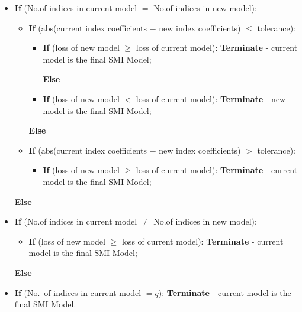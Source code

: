 \documentclass[11pt,a4paper,]{article}
\providecommand{\tightlist}{%
  \setlength{\itemsep}{0pt}\setlength{\parskip}{0pt}}
\begin{document}
\begin{enumerate}
\begin{enumerate}
    \begin{itemize}
    \item
      \textbf{If} (No.of indices in current model \(=\) No.of indices in
      new model):

      \begin{itemize}
      \item
        \textbf{If} (abs(current index coefficients \(-\) new index
        coefficients) \(\le\) tolerance):

        \begin{itemize}
        \item
          \textbf{If} (loss of new model \(\ge\) loss of current model):
          \textbf{Terminate} - current model is the final SMI Model;

          \textbf{Else}
        \item
          \textbf{If} (loss of new model \(<\) loss of current model):
          \textbf{Terminate} - new model is the final SMI Model;
        \end{itemize}

        \textbf{Else}
      \item
        \textbf{If} (abs(current index coefficients \(-\) new index
        coefficients) \(>\) tolerance):

        \begin{itemize}
        \tightlist
        \item
          \textbf{If} (loss of new model \(\ge\) loss of current model):
          \textbf{Terminate} - current model is the final SMI Model;
        \end{itemize}
      \end{itemize}

      \textbf{Else}
    \item
      \textbf{If} (No.of indices in current model \(\neq\) No.of indices
      in new model):

      \begin{itemize}
      \tightlist
      \item
        \textbf{If} (loss of new model \(\ge\) loss of current model):
        \textbf{Terminate} - current model is the final SMI Model;
      \end{itemize}

      \textbf{Else}
    \item
      \textbf{If} (No.~of indices in current model \(= q\)):
      \textbf{Terminate} - current model is the final SMI Model.
    \end{itemize}
  \end{enumerate}
\end{enumerate}
\end{document}
